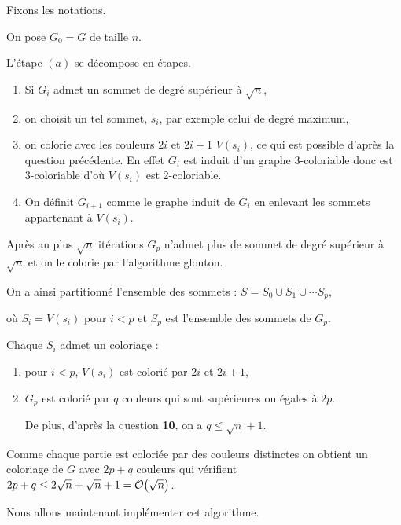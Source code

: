 \begin{Answer}
Fixons les notations.

On pose $G_0=G$ de taille $n$.

L'étape $(a)$ se décompose en étapes.
\begin{enumerate}[noitemsep]
    \item Si $G_i$ admet un sommet de degré supérieur à $\sqrt n$,
    \item on choisit un tel sommet, $s_i$, par exemple celui de degré maximum,
    \item on colorie avec les couleurs $2i$ et $2i+1$ $V(s_i)$, ce qui est possible d'après la question précédente. En effet $G_i$ est induit d'un graphe 3-coloriable donc est 3-coloriable d'où $V(s_i)$ est 2-coloriable.
    \item On définit $G_{i+1}$ comme le graphe induit de $G_i$ en enlevant les sommets appartenant à $V(s_i)$.
\end{enumerate}
Après au plus $\sqrt n$ itérations $G_p$ n'admet plus de sommet de degré supérieur à $\sqrt n$ et on le colorie par l'algorithme glouton.

On a ainsi partitionné l'ensemble des sommets : $S = S_0\cup S_1\cup\cdots S_p$,

où $S_i=V(s_i)$ pour $i<p$ et $S_p$ est l'ensemble des sommets de $G_p$.

Chaque $S_i$ admet un coloriage : 
\begin{enumerate}[noitemsep]
    \item pour $i<p$,  $V(s_i)$ est colorié par $2i$ et $2i+1$,
    \item $G_p$ est colorié par $q$ couleurs qui sont supérieures ou égales à $2p$. 
    
    De plus, d'après la question {\bf 10}, on a $q\le\sqrt n+1$.
\end{enumerate}
Comme chaque partie est coloriée par des couleurs distinctes on obtient un coloriage de $G$ avec $2p+q$ couleurs qui vérifient $2p+q \le 2\sqrt n + \sqrt n +1 = {\cal O}\bigl(\sqrt n\bigr)$.
\end{Answer}
Nous allons maintenant implémenter cet algorithme. 

